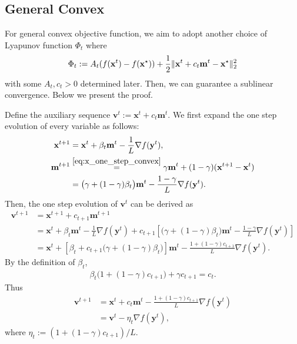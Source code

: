 \documentclass{article}
\theoremstyle{plain}
\theoremstyle{definition}
\theoremstyle{remark}
\def\bx{\mathbf{x}}
\def\bv{\mathbf{v}}
\begin{document}
\subsection{General Convex} \label{app:proof_cvx}
For general convex objective function, we aim to adopt another choice of Lyapunov function $\Phi_t$ where
\begin{equation} \label{eq:lyap_cvx}
    \Phi_t:= A_t(f(\bx^t) - f(\bx^\star)) + \frac{1}{2} \|\bx^t + c_t {\bf m}^t - \bx^\star \|^2_2
\end{equation}
with some $A_t, c_t > 0$ determined later. Then, we can guarantee a sublinear convergence. Below we present the proof.

Define the auxiliary sequence
$
\mathbf{v}^{t}:=\mathbf{x}^{t}+c_t\mathbf{m}^{t}.
$
We first expand the one step evolution of every variable as follows:
\begin{align}
\mathbf{x}^{t+1}
&=
\mathbf{x}^{t}+\beta_t \mathbf{m}^{t}-\frac1L \nabla f(\mathbf{y}^{t}),\label{eq:x_one_step_convex}\\
\mathbf{m}^{t+1} 
&\stackrel{\eqref{eq:x_one_step_convex}}{=}
\gamma \mathbf{m}^{t}
+
(1-\gamma)(\mathbf{x}^{t+1}-\mathbf{x}^{t}) \\
&=
\bigl(\gamma+(1-\gamma)\beta_t\bigr)\mathbf{m}^{t}
-
\frac{1-\gamma}{L}\nabla f(\mathbf{y}^{t}).
\end{align}
Then, the one step evolution of $\bv^t$ can be derived as
\begin{align}
\mathbf{v}^{t+1}
&=\mathbf{x}^{t+1}+c_{t+1}\mathbf{m}^{t+1} \\
&=
\mathbf{x}^{t}+\beta_t \mathbf{m}^{t}-\frac1L \nabla f(\mathbf{y}^{t})
+
c_{t+1}
\left[
\bigl(\gamma+(1-\gamma)\beta_t\bigr)\mathbf{m}^{t}
-
\frac{1-\gamma}{L}\nabla f(\mathbf{y}^{t})
\right] \\
&=
\mathbf{x}^{t}
+
\left[
\beta_t+c_{t+1}\bigl(\gamma+(1-\gamma)\beta_t\bigr)
\right]\mathbf{m}^{t}
-
\frac{1+(1-\gamma)c_{t+1}}{L}\nabla f(\mathbf{y}^{t}).
\end{align}
By the definition of \(\beta_t\),
\begin{align}
\beta_t\bigl(1+(1-\gamma)c_{t+1}\bigr)+\gamma c_{t+1}=c_t.
\end{align}
Thus
\begin{align}
\mathbf{v}^{t+1}
&=
\mathbf{x}^{t}+c_t\mathbf{m}^{t}
-
\frac{1+(1-\gamma)c_{t+1}}{L}\nabla f(\mathbf{y}^{t}) \\
&=
\mathbf{v}^{t}-\eta_t \nabla f(\mathbf{y}^{t}), \label{eq:vt_dyn_convex}
\end{align}
where
$
\eta_t:=(1+(1-\gamma)c_{t+1})/L.
$
\end{document}
